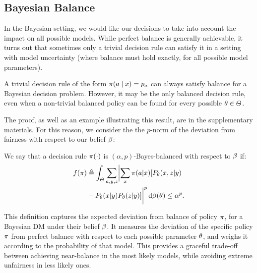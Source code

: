 \subsection{Bayesian Balance}
\label{sec:bayesian-balance}

In the Bayesian setting, we would like our decisions to take into
account the impact on all possible models.
While perfect balance is generally achievable, it turns out that
sometimes only
a trivial decision rule can satisfy it
in a setting with model
uncertainty (where balance
must hold exactly, for all possible model
parameters).
%
%
\begin{theorem}
  A trivial decision rule of the form $\pi(a \mid x) = p_a$ can always satisfy balance for a Bayesian decision problem. However, it may be the only balanced decision rule, even when a non-trivial balanced policy can be found for every possible $\theta \in \Theta$.
  \label{lem:trivial-balance}
\end{theorem}

The proof, as well as  an example illustrating this
result, are in the supplementary materials. For this reason, we consider the the $p$-norm of the deviation from fairness with respect to our belief $\beta$:
\begin{definition}
  We say that a decision rule $\pi(\cdot)$ is $(\alpha,p)$-Bayes-balanced with respect to $\beta$ if:
  \begin{align}
    f(\pi) &\mathrel{\triangleq} 
    \int_{\Theta }
    \sum_{a, y, z}
    \biggl |\sum_x \pi(a | x)
    [P_\theta(x, z | y)
    \nonumber \\
    &- P_\theta(x | y) P_\theta(z | y) ] 
    \biggr |^p
    \,\mathrm{d} \beta(\theta) 
    \leq \alpha^p.
      \label{eq:balanced-bayes-norm}
  \end{align}
\end{definition}

This definition captures the expected deviation from balance of  policy $\pi$, for a Bayesian DM under their belief $\beta$. It measures the deviation of the specific policy $\pi$ from perfect balance with respect to each possible parameter $\param$, and weighs it according to the probability of that model. This
provides a graceful trade-off between achieving near-balance in the most likely models, while avoiding extreme unfairness in less likely ones.
\iffalse
Achieving perfect fairness in \eqref{eq:balanced-bayes-norm},
i.e. ensuring $f(\pol) = 0$, suggests two sufficient conditions. One
is $x \indep z \mid y$, which is something that depends entirely on
$P_\param$ rather than the decision rule itself.  However, we cannot
rely on this condition to hold for all models $\param$.  A second
sufficient condition for $\alpha = 0$
in~\eqref{eq:balanced-bayes-norm} is that the distribution on actions
$a$ is orthogonal to the difference between the joint distribution of
$z, y$ and their marginals conditioned on $x$. This difference is
essentially measuring the amount of dependence, so to achieve perfect
independence we should be orthogonal for every observation $x$ and
parameter setting $\param$, which is generally not possible, as we
already argued in Lemma~\ref{lem:trivial-balance}.
\fi

